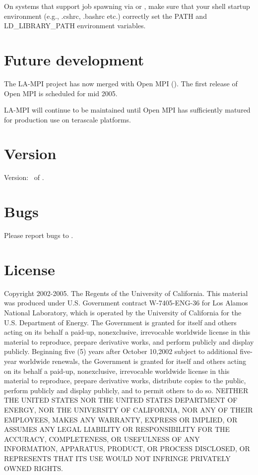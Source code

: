 \documentclass[english]{article}
\begin{document}
On systems that support job spawning via  or ,
make sure that your shell startup environment (e.g., .cshrc, .bashrc
etc.) correctly set the PATH and LD\_LIBRARY\_PATH environment
variables.

\section{Future development}
The LA-MPI project has now merged with Open MPI
().  The first release of Open MPI is
scheduled for mid 2005.

LA-MPI will continue to be maintained until Open MPI has sufficiently
matured for production use on terascale platforms.

\section{Version}
Version: \Version\ of \Date.

\section{Bugs}
Please report bugs to .

\section{License}

Copyright 2002-2005.  The Regents of the University of
California. This material was produced under U.S. Government contract
W-7405-ENG-36 for Los Alamos National Laboratory, which is operated by
the University of California for the U.S. Department of Energy. The
Government is granted for itself and others acting on its behalf a
paid-up, nonexclusive, irrevocable worldwide license in this material
to reproduce, prepare derivative works, and perform publicly and
display publicly. Beginning five (5) years after October 10,2002
subject to additional five-year worldwide renewals, the Government is
granted for itself and others acting on its behalf a paid-up,
nonexclusive, irrevocable worldwide license in this material to
reproduce, prepare derivative works, distribute copies to the public,
perform publicly and display publicly, and to permit others to do
so. NEITHER THE UNITED STATES NOR THE UNITED STATES DEPARTMENT OF
ENERGY, NOR THE UNIVERSITY OF CALIFORNIA, NOR ANY OF THEIR EMPLOYEES,
MAKES ANY WARRANTY, EXPRESS OR IMPLIED, OR ASSUMES ANY LEGAL LIABILITY
OR RESPONSIBILITY FOR THE ACCURACY, COMPLETENESS, OR USEFULNESS OF ANY
INFORMATION, APPARATUS, PRODUCT, OR PROCESS DISCLOSED, OR REPRESENTS
THAT ITS USE WOULD NOT INFRINGE PRIVATELY OWNED RIGHTS.
\end{document}
